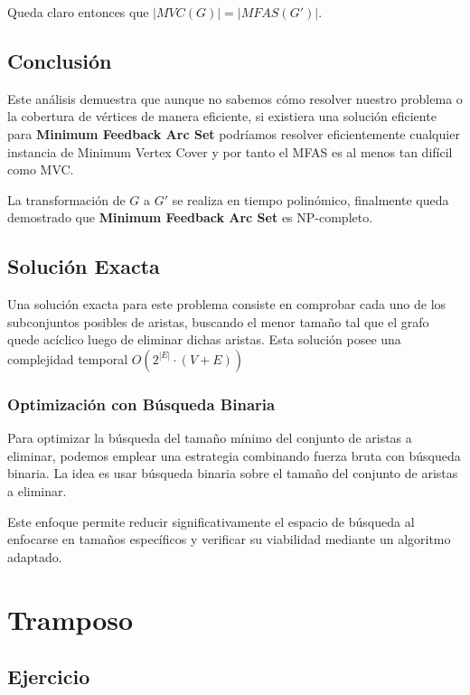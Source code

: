 \documentclass{article}
\begin{document}
Queda claro entonces que $|MVC(G)| = |MFAS(G')|$.

\subsection{Conclusión}

Este análisis demuestra que aunque no sabemos cómo resolver nuestro problema o la cobertura de vértices de manera eficiente, si existiera una solución eficiente para \textbf{Minimum Feedback Arc Set} podríamos resolver eficientemente cualquier instancia de Minimum Vertex Cover y por tanto el MFAS es al menos tan difícil como MVC.

La transformación de $ G $ a $ G' $ se realiza en tiempo polinómico, finalmente queda demostrado que \textbf{Minimum Feedback Arc Set} es NP-completo.

\subsection{Solución Exacta}

Una solución exacta para este problema consiste en comprobar cada uno de los subconjuntos posibles de aristas, buscando el menor tamaño tal que el grafo quede acíclico luego de eliminar dichas aristas. Esta solución posee una complejidad temporal $O(2^{|E|} \cdot (V + E))$

\subsubsection{Optimización con Búsqueda Binaria}

Para optimizar la búsqueda del tamaño mínimo del conjunto de aristas a eliminar, podemos emplear una estrategia combinando fuerza bruta con búsqueda binaria. La idea es usar búsqueda binaria sobre el tamaño del conjunto de aristas a eliminar.

Este enfoque permite reducir significativamente el espacio de búsqueda al enfocarse en tamaños específicos y verificar su viabilidad mediante un algoritmo adaptado.

\section{Tramposo}

\subsection{Ejercicio}
\end{document}
